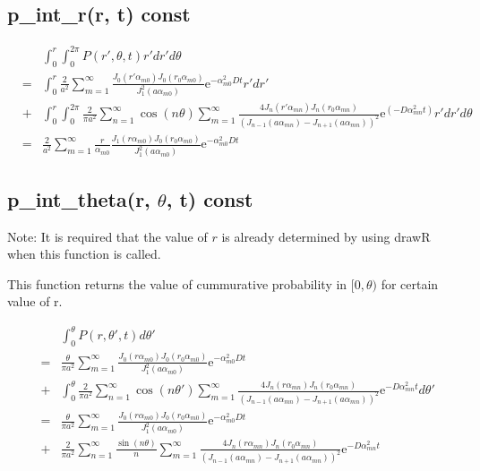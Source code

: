 \documentclass{article}
\begin{document}
\subsection{p\_int\_r(r, t) const}

\begin{eqnarray}
    & & \int^r_0 \int^{2\pi}_0 P(r', \theta, t) r'dr'd\theta \nonumber \\
    &=& \int^r_0 \frac{2}{a^2} \sum^{\infty}_{m=1}
        \frac{J_0(r'\alpha_{m0}) J_0(r_0\alpha_{m0})}{J^2_1(a\alpha_{m0})}
        \mathrm{e}^{-\alpha^2_{m0}Dt} r'dr' \nonumber \\
    &+& \int^r_0 \int^{2\pi}_0 
        \frac{2}{\pi a^2}\sum^{\infty}_{n=1}\cos(n\theta)
        \sum^{\infty}_{m=1}
        \frac{4J_n(r'\alpha_{mn})J_n(r_0\alpha_{mn})}
             {(J_{n-1}(a\alpha_{mn})-J_{n+1}(a\alpha_{mn}))^2}
        \mathrm{e}^{(-D\alpha^2_{mn} t)} r'dr'd\theta \nonumber \\
    &=& \frac{2}{a^2}\sum^\infty_{m=1} \frac{r}{\alpha_{m0}}
        \frac{J_1(r\alpha_{m0})J_0(r_0\alpha_{m0})}{J^2_1(a\alpha_{m0})}
        \mathrm{e}^{-\alpha^2_{m0}Dt}\nonumber
\end{eqnarray}

\subsection{p\_int\_theta(r, $\theta$, t) const}

Note: It is required that the value of $r$ is already determined by using drawR when this function is called.

This function returns the value of cummurative probability in $[0,\theta)$ for certain value of r.

\begin{eqnarray}
    & & \int^\theta_0 P(r, \theta', t) d\theta' \nonumber\\
    &=& \frac{\theta}{\pi a^2} \sum^{\infty}_{m=1}
        \frac{J_0(r\alpha_{m0}) J_0(r_0\alpha_{m0})}{J^2_1(a\alpha_{m0})}
        \mathrm{e}^{-\alpha^2_{m0}Dt} \nonumber \\
    &+& \int^{\theta}_0 \frac{2}{\pi a^2}\sum^{\infty}_{n=1}\cos(n\theta')\sum^{\infty}_{m=1}
        \frac{4J_n(r\alpha_{mn})J_n(r_0\alpha_{mn})}{(J_{n-1}(a\alpha_{mn})-J_{n+1}(a\alpha_{mn}))^2}
        \mathrm{e}^{-D\alpha^2_{mn} t} d\theta' \nonumber \\
    &=& \frac{\theta}{\pi a^2} \sum^{\infty}_{m=1}
        \frac{J_0(r\alpha_{m0}) J_0(r_0\alpha_{m0})}{J^2_1(a\alpha_{m0})}
        \mathrm{e}^{-\alpha^2_{m0}Dt} \nonumber \\
    &+& \frac{2}{\pi a^2} \sum^\infty_{n=1} \frac{\sin(n\theta)}{n}
        \sum^\infty_{m=1} \frac{4J_n(r\alpha_{mn})J_n(r_0\alpha_{mn})}{(J_{n-1}(a\alpha_{mn})-J_{n+1}(a\alpha_{mn}))^2}
        \mathrm{e}^{-D\alpha^2_{mn} t} \nonumber
\end{eqnarray}
\end{document}
